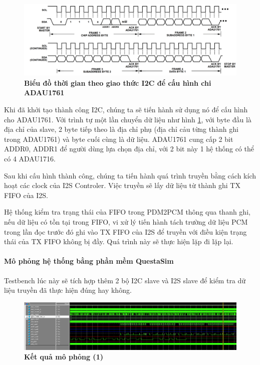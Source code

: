 \begin{figure}[H]
    \centering
    \includegraphics[width=14cm]{Images/Chuong5/fpga/i2c_timing.png}
    \caption[Biểu đồ thời gian theo giao thức I2C để cấu hình chi ADAU1761]{\bfseries \fontsize{12pt}{0pt}\selectfont Biểu đồ thời gian theo giao thức I2C để cấu hình chi ADAU1761}
    \label{i2c_timing}
\end{figure}

Khi đã khởi tạo thành công I2C, chúng ta sẽ tiến hành sử dụng nó để cấu hình cho ADAU1761. Với trình tự một lần chuyển dữ liệu như hình \ref{i2c_timing}, với byte đầu là địa chỉ của slave, 2 byte tiếp theo là địa chỉ phụ (địa chỉ cảu từng thành ghi trong ADAU1761) và byte cuối cùng là dữ liệu. ADAU1761 cung cấp 2 bit ADDR0, ADDR1 để người dùng lựa chọn địa chỉ, với 2 bit này 1 hệ thống có thể có 4 ADAU1716.

Sau khi cấu hình thành công, chúng ta tiến hành quá trình truyền bằng cách kích hoạt các clock của I2S Controler. Việc truyền sẽ lấy dữ liệu từ thành ghi TX FIFO của I2S.

Hệ thống kiểm tra trạng thái của FIFO trong PDM2PCM thông qua thanh ghi, nếu dữ liệu có tồn tại trong FIFO, vi xử lý tiến hành tách trường dữ liệu PCM trong lần đọc trước đó ghi vào TX FIFO của I2S để truyền với điều kiện trạng thái của TX FIFO không bị đầy. Quá trình này sẽ thực hiện lặp đi lặp lại.

\paragraph{Mô phỏng hệ thống bằng phần mềm QuestaSim}

Testbench lúc này sẽ tích hợp thêm 2 bộ I2C slave và I2S slave để kiểm tra dữ liệu truyền đã thực hiện đúng hay không. 
\begin{figure}[H]
    \centering
    \includegraphics[width=15cm]{Images/Chuong5/fpga/sim_1.png}
    \caption[Kết quả mô phỏng (1)]{\bfseries \fontsize{12pt}{0pt}\selectfont Kết quả mô phỏng (1)}
    \label{sim_1}
\end{figure}

